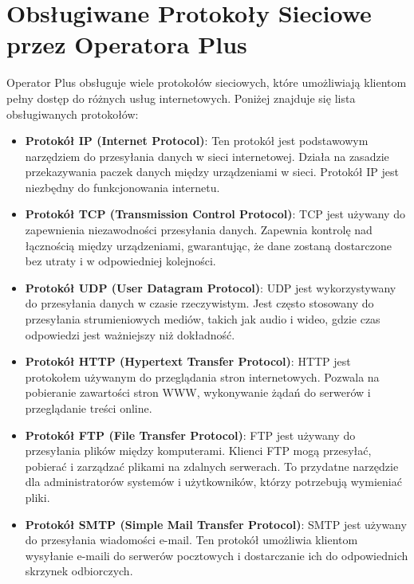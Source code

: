 \section{Obsługiwane Protokoły Sieciowe przez Operatora Plus}

Operator Plus obsługuje wiele protokołów sieciowych, które umożliwiają klientom pełny dostęp do różnych usług internetowych. Poniżej znajduje się lista obsługiwanych protokołów:

\begin{itemize}
    \item \textbf{Protokół IP (Internet Protocol)}: Ten protokół jest podstawowym narzędziem do przesyłania danych w sieci internetowej. Działa na zasadzie przekazywania paczek danych między urządzeniami w sieci. Protokół IP jest niezbędny do funkcjonowania internetu.

    \item \textbf{Protokół TCP (Transmission Control Protocol)}: TCP jest używany do zapewnienia niezawodności przesyłania danych. Zapewnia kontrolę nad łącznością między urządzeniami, gwarantując, że dane zostaną dostarczone bez utraty i w odpowiedniej kolejności.

    \item \textbf{Protokół UDP (User Datagram Protocol)}: UDP jest wykorzystywany do przesyłania danych w czasie rzeczywistym. Jest często stosowany do przesyłania strumieniowych mediów, takich jak audio i wideo, gdzie czas odpowiedzi jest ważniejszy niż dokładność.

    \item \textbf{Protokół HTTP (Hypertext Transfer Protocol)}: HTTP jest protokołem używanym do przeglądania stron internetowych. Pozwala na pobieranie zawartości stron WWW, wykonywanie żądań do serwerów i przeglądanie treści online.

    \item \textbf{Protokół FTP (File Transfer Protocol)}: FTP jest używany do przesyłania plików między komputerami. Klienci FTP mogą przesyłać, pobierać i zarządzać plikami na zdalnych serwerach. To przydatne narzędzie dla administratorów systemów i użytkowników, którzy potrzebują wymieniać pliki.

    \item \textbf{Protokół SMTP (Simple Mail Transfer Protocol)}: SMTP jest używany do przesyłania wiadomości e-mail. Ten protokół umożliwia klientom wysyłanie e-maili do serwerów pocztowych i dostarczanie ich do odpowiednich skrzynek odbiorczych.


\end{itemize}
